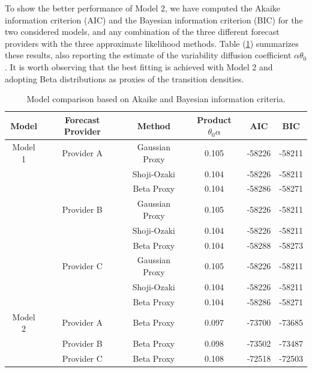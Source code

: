 \documentclass[11pt]{article}
\theoremstyle{definition}
\begin{document}
To show the better performance of Model 2, we have computed the Akaike information criterion (AIC) and the Bayesian information criterion (BIC) for the two considered models, and any combination of the three different forecast providers with the three approximate likelihood methods. Table (\ref{tab:model_comparison}) summarizes these results, also reporting the estimate of the variability diffusion coefficient $\alpha \theta_0$. 
It is worth observing that the best fitting is achieved with Model 2 and adopting Beta distributions as proxies of the transition densities.

\begin{table}[H]
\centering
\begin{tabular}{cccccc}
\toprule
Model & Forecast Provider & Method & Product $\theta_0\alpha$   & AIC & BIC \\ \midrule
Model 1 & Provider A & Gaussian Proxy & 0.105 & -58226 & -58211 \\
 &  & Shoji-Ozaki & 0.104 & -58226 & -58211 \\
 &  & Beta Proxy & 0.104 & -58286 & -58271 \\
 & Provider B & Gaussian Proxy & 0.105 & -58226   & -58211 \\
 &  & Shoji-Ozaki & 0.104 & -58226 & -58211 \\
 &  & Beta Proxy & 0.104 & -58288 & -58273 \\
 & Provider C & Gaussian Proxy & 0.105 & -58226 & -58211 \\
 &  & Shoji-Ozaki & 0.104 & -58226 & -58211 \\
 &  & Beta Proxy & 0.104 & -58286 & -58271 \\
Model 2 & Provider A & Beta Proxy & 0.097 & -73700   & -73685 \\ 
 & Provider B & Beta Proxy & 0.098 &  -73502 & -73487 \\ 
 & Provider C & Beta Proxy & 0.108 & -72518 & -72503 \\ 
\bottomrule
\end{tabular}
\caption{Model comparison based on Akaike and Bayesian information criteria.}
\label{tab:model_comparison}
\end{table}
\end{document}
